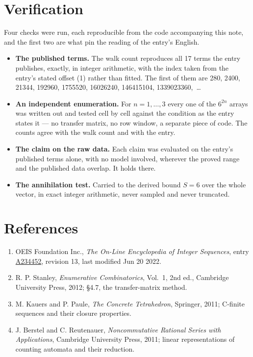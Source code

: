 \documentclass[11pt]{article}
\theoremstyle{definition}
\begin{document}
\section{Verification}

Four checks were run, each reproducible from the code accompanying this note, and the first two are what pin the reading of the entry's English.

\begin{itemize}

\item {\bfseries The published terms.} The walk count reproduces all 17 terms the entry publishes, exactly, in integer arithmetic, with the index taken from the entry's stated offset (1) rather than fitted. The first of them are 280, 2400, 21344, 192960, 1755520, 16026240, 146415104, 1339023360,~\dots

\item {\bfseries An independent enumeration.} For $n = 1,\dots,3$ every one of the $6^{2n}$ arrays was written out and tested cell by cell against the condition as the entry states it --- no transfer matrix, no row window, a separate piece of code. The counts agree with the walk count and with the entry.

\item {\bfseries The claim on the raw data.} Each claim was evaluated on the entry's published terms alone, with no model involved, wherever the proved range and the published data overlap. It holds there.

\item {\bfseries The annihilation test.} Carried to the derived bound $S = 6$ over the whole vector, in exact integer arithmetic, never sampled and never truncated.

\end{itemize}

\section{References}

\begin{enumerate}

\item OEIS Foundation Inc., \emph{The On-Line Encyclopedia of Integer Sequences}, entry \href{https://oeis.org/A234452}{A234452}, revision 13, last modified Jun 20 2022.

\item R. P. Stanley, \emph{Enumerative Combinatorics}, Vol.~1, 2nd ed., Cambridge University Press, 2012; \S4.7, the transfer-matrix method.

\item M. Kauers and P. Paule, \emph{The Concrete Tetrahedron}, Springer, 2011; C-finite sequences and their closure properties.

\item J. Berstel and C. Reutenauer, \emph{Noncommutative Rational Series with Applications}, Cambridge University Press, 2011; linear representations of counting automata and their reduction.

\end{enumerate}
\end{document}
